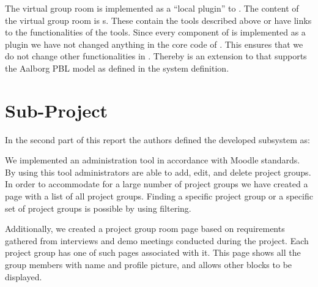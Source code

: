 
The virtual group room is implemented as a ``local plugin'' to \moodle{}.
The content of the virtual group room is \block{}s.
These contain the tools described above or have links to the functionalities of the tools.
Since every component of \system{} is implemented as a \moodle{} plugin we have not changed anything in the core code of \moodle{}.
This ensures that we do not change other functionalities in \moodle{}.
Thereby \system{} is an extension to \moodle{} that supports the Aalborg PBL model as defined in the system definition.

\section{Sub-Project}
\label{sec:subconclusion}


In the second part of this report the authors defined the developed subsystem as:





We implemented an administration tool in accordance with Moodle standards.
By using this tool administrators are able to add, edit, and delete project groups.
In order to accommodate for a large number of project groups we have created a page with a list of all project groups.
Finding a specific project group or a specific set of project groups is possible by using filtering.

Additionally, we created a project group room page based on requirements gathered from interviews and demo meetings conducted during the project.
Each project group has one of such pages associated with it.
This page shows all the group members with name and profile picture, and allows other \system{} blocks to be displayed.

